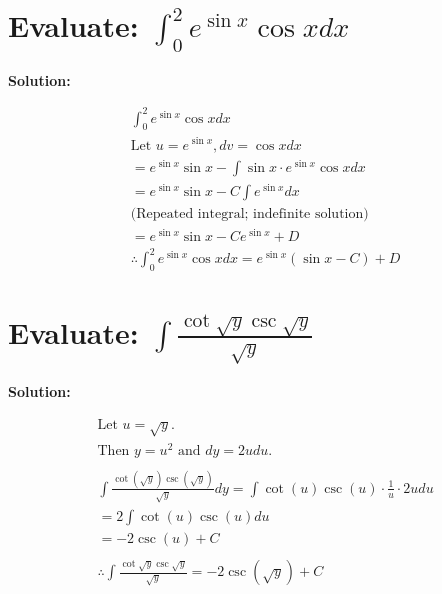 \documentclass{article}
\begin{document}
\newpage
\section{Evaluate: $\int_0^2 e^{\sin x} \cos x dx$}

\textbf{Solution:}

\begin{align*}
     & \int_0^2 e^{\sin x} \cos x dx                                            \\
     & \text{Let } u = e^{\sin x}, dv = \cos x dx                               \\
     & = e^{\sin x} \sin x - \int \sin x \cdot e^{\sin x} \cos x dx             \\
     & = e^{\sin x} \sin x - C \int e^{\sin x} dx                               \\
     & \text{(Repeated integral; indefinite solution)}                          \\
     & = e^{\sin x} \sin x - C e^{\sin x} + D                                   \\
     & \therefore \int_0^2 e^{\sin x} \cos x dx = {e^{\sin x} (\sin x - C) + D}
\end{align*}

\section{Evaluate: $\int \frac{\cot \sqrt{y} \csc \sqrt{y}}{\sqrt{y}}$}
\textbf{Solution:}

\begin{align*}
     & \text{Let } u = \sqrt{y}.                                                                                   \\
     & \text{Then } y = u^2 \text{ and } dy = 2u du.                                                               \\
    \\
     & \int \frac{\cot(\sqrt{y}) \csc(\sqrt{y})}{\sqrt{y}} dy = \int \cot(u) \csc(u) \cdot \frac{1}{u} \cdot 2u du \\
     & = 2 \int \cot(u) \csc(u) du                                                                                 \\
     & = -2 \csc(u) + C                                                                                            \\
    \\
     & \therefore \int \frac{\cot \sqrt{y} \csc \sqrt{y}}{\sqrt{y}} = {-2 \csc(\sqrt{y}) + C}
\end{align*}
\end{document}
